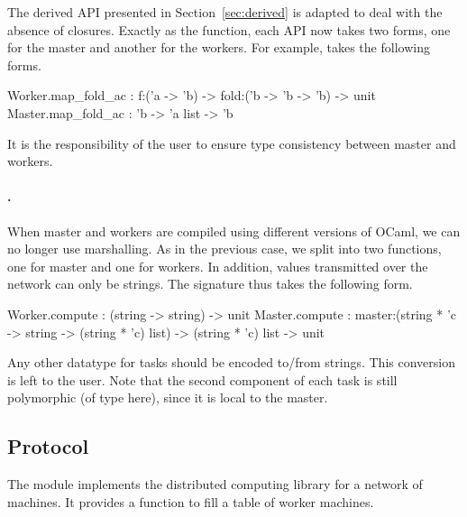 \documentclass{llncs}
\newcommand{\Ocaml}{OCaml}
\begin{document}
  The derived API presented in Section~\ref{sec:derived} is adapted to
  deal with the absence of closures. Exactly as the 
  function, each API now takes two forms, one for the master and
  another for the workers. For example,  takes the
  following forms.
  \begin{ocaml}
  Worker.map_fold_ac : f:('a -> 'b) -> fold:('b -> 'b -> 'b) -> unit 
  Master.map_fold_ac : 'b -> 'a list -> 'b
  \end{ocaml}
  It is the responsibility of the user to ensure type consistency
  between master and workers.

  \paragraph{.} When master and workers are compiled using
  different versions of \Ocaml, we can no longer use marshalling.  As
  in the previous case, we split  into two functions, one
  for master and one for workers. In addition, values transmitted over
  the network can only be strings. The signature thus takes the
  following form.
  \begin{ocaml}
  Worker.compute : (string -> string) -> unit 
  Master.compute : 
    master:(string * 'c -> string -> (string * 'c) list) -> 
    (string * 'c) list -> unit
  \end{ocaml}
  Any other datatype for tasks should be encoded to/from strings. This
  conversion is left to the user.  Note that the second component of
  each task is still polymorphic (of type  here), since it is
  local to the master.



\subsection{Protocol}\label{sec:protocol}

The  module implements the distributed computing library
for a network of machines. 
It provides a function
 to fill a table of
worker machines. 
\end{document}
